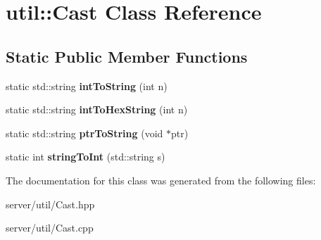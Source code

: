 \hypertarget{classutil_1_1_cast}{\section{util\-:\-:Cast Class Reference}
\label{classutil_1_1_cast}
}
\subsection*{Static Public Member Functions}
\begin{DoxyCompactItemize}
\item 
\hypertarget{classutil_1_1_cast_a853ea6a19a8158df94f05770f5b50d0b}{static std\-::string {\bfseries int\-To\-String} (int n)}\label{classutil_1_1_cast_a853ea6a19a8158df94f05770f5b50d0b}

\item 
\hypertarget{classutil_1_1_cast_a4451fe6524ed8fd9d741bdb908170315}{static std\-::string {\bfseries int\-To\-Hex\-String} (int n)}\label{classutil_1_1_cast_a4451fe6524ed8fd9d741bdb908170315}

\item 
\hypertarget{classutil_1_1_cast_ab7490a99babcb8d23d010b24a5b8cf4a}{static std\-::string {\bfseries ptr\-To\-String} (void $\ast$ptr)}\label{classutil_1_1_cast_ab7490a99babcb8d23d010b24a5b8cf4a}

\item 
\hypertarget{classutil_1_1_cast_ad9e6c139399f25c94ce51ec79c6b6129}{static int {\bfseries string\-To\-Int} (std\-::string s)}\label{classutil_1_1_cast_ad9e6c139399f25c94ce51ec79c6b6129}

\end{DoxyCompactItemize}


The documentation for this class was generated from the following files\-:\begin{DoxyCompactItemize}
\item 
server/util/Cast.\-hpp\item 
server/util/Cast.\-cpp\end{DoxyCompactItemize}
